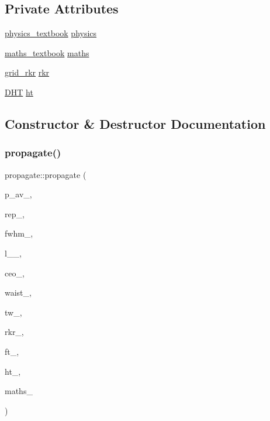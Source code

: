 \subsection*{Private Attributes}
\begin{DoxyCompactItemize}
\item 
\hyperlink{classphysics__textbook}{physics\+\_\+textbook} \hyperlink{classpropagate_a5f5fdad229714c1ad7f7324e0c51efcb}{physics}
\item 
\hyperlink{classmaths__textbook}{maths\+\_\+textbook} \hyperlink{classpropagate_a31485a3e1e9d0e346228910034095766}{maths}
\item 
\hyperlink{classgrid__rkr}{grid\+\_\+rkr} \hyperlink{classpropagate_ad28456de6e333e20b03dc8bc48b6296d}{rkr}
\item 
\hyperlink{class_d_h_t}{D\+HT} \hyperlink{classpropagate_a9cd602470fff3502b3b048f9aa915805}{ht}
\end{DoxyCompactItemize}


\subsection{Constructor \& Destructor Documentation}
\mbox{\label{classpropagate_a87a93848027b75f6963d0fd81e233249}} 
\subsubsection{\texorpdfstring{propagate()}{propagate()}}
{\footnotesize\ttfamily propagate\+::propagate (\begin{DoxyParamCaption}\item[{double}]{p\+\_\+av\+\_\+,  }\item[{double}]{rep\+\_\+,  }\item[{double}]{fwhm\+\_\+,  }\item[{double}]{l\+\_\+\_\+,  }\item[{double}]{ceo\+\_\+,  }\item[{double}]{waist\+\_\+,  }\item[{grid\+\_\+tw \&}]{tw\+\_\+,  }\item[{\hyperlink{classgrid__rkr}{grid\+\_\+rkr} \&}]{rkr\+\_\+,  }\item[{D\+F\+T\+I\+\_\+\+D\+E\+S\+C\+R\+I\+P\+T\+O\+R\+\_\+\+H\+A\+N\+D\+LE \&}]{ft\+\_\+,  }\item[{\hyperlink{class_d_h_t}{D\+HT} \&}]{ht\+\_\+,  }\item[{\hyperlink{classmaths__textbook}{maths\+\_\+textbook} \&}]{maths\+\_\+ }\end{DoxyParamCaption})}



